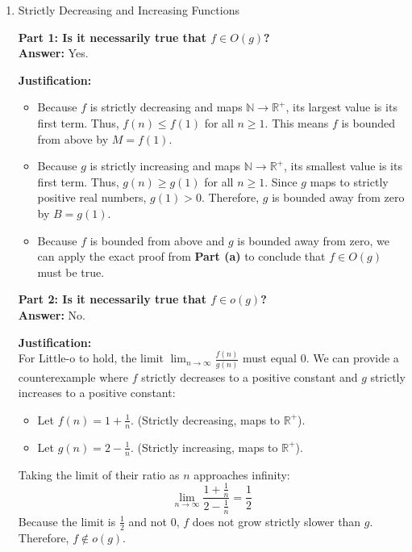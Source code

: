 \documentclass[11pt]{article}
\begin{document}
\begin{enumerate}[label=\textbf{(\alph*)}]
If $f \in O(g)$ were true, there would exist constants $c > 0$ and $n_0$ such that for all $n \ge n_0$:
\[
1 \le c \cdot \left(\frac{1}{n}\right) \implies n \le c
\]
This inequality is impossible to satisfy for all $n \ge n_0$ because $c$ is a fixed constant, but $n$ grows infinitely large. Therefore, $f \notin O(g)$.

\item Strictly Decreasing and Increasing Functions

\textbf{Part 1: Is it necessarily true that $f \in O(g)$?}\\
\textbf{Answer:} Yes.

\textbf{Justification:}
\begin{itemize}
    \item Because $f$ is strictly decreasing and maps $\mathbb{N} \to \mathbb{R}^+$, its largest value is its first term. Thus, $f(n) \le f(1)$ for all $n \ge 1$. This means $f$ is bounded from above by $M = f(1)$.
    \item Because $g$ is strictly increasing and maps $\mathbb{N} \to \mathbb{R}^+$, its smallest value is its first term. Thus, $g(n) \ge g(1)$ for all $n \ge 1$. Since $g$ maps to strictly positive real numbers, $g(1) > 0$. Therefore, $g$ is bounded away from zero by $B = g(1)$.
    \item Because $f$ is bounded from above and $g$ is bounded away from zero, we can apply the exact proof from \textbf{Part (a)} to conclude that $f \in O(g)$ must be true.
\end{itemize}

\vspace{0.5cm}

\textbf{Part 2: Is it necessarily true that $f \in o(g)$?}\\
\textbf{Answer:} No.

\textbf{Justification:}\\
For Little-o to hold, the limit $\lim_{n \to \infty} \frac{f(n)}{g(n)}$ must equal $0$. We can provide a counterexample where $f$ strictly decreases to a positive constant and $g$ strictly increases to a positive constant:
\begin{itemize}
    \item Let $f(n) = 1 + \frac{1}{n}$. (Strictly decreasing, maps to $\mathbb{R}^+$).
    \item Let $g(n) = 2 - \frac{1}{n}$. (Strictly increasing, maps to $\mathbb{R}^+$).
\end{itemize}

Taking the limit of their ratio as $n$ approaches infinity:
\[
\lim_{n \to \infty} \frac{1 + \frac{1}{n}}{2 - \frac{1}{n}} = \frac{1}{2}
\]
Because the limit is $\frac{1}{2}$ and not $0$, $f$ does not grow strictly slower than $g$. Therefore, $f \notin o(g)$.

\end{enumerate}
\end{document}
